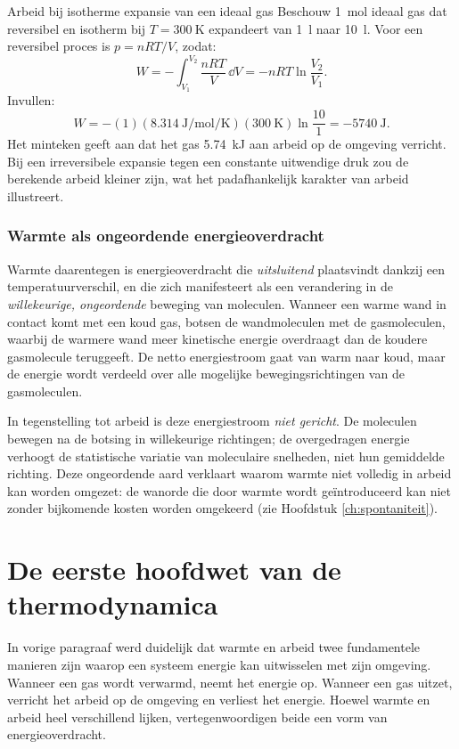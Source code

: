 \begin{voorbeeld}{Arbeid bij isotherme expansie van een ideaal gas}
Beschouw \SI{1}{\mole} ideaal gas dat reversibel en isotherm bij $T = \SI{300}{\kelvin}$ expandeert van \SI{1}{\litre} naar \SI{10}{\litre}. Voor een reversibel proces is $p = nRT/V$, zodat:
\[
W = -\int_{V_1}^{V_2} \frac{nRT}{V}\,\dd V = -nRT \ln\frac{V_2}{V_1}.
\]
Invullen:
\[
W = -(1)(\SI{8.314}{\joule\per\mole\per\kelvin})(\SI{300}{\kelvin})\ln\frac{10}{1} = -\SI{5740}{\joule}.
\]
Het minteken geeft aan dat het gas \SI{5.74}{\kilo\joule} aan arbeid op de omgeving verricht. Bij een irreversibele expansie tegen een constante uitwendige druk zou de berekende arbeid kleiner zijn, wat het padafhankelijk karakter van arbeid illustreert.
\end{voorbeeld}

\subsubsection{Warmte als ongeordende energieoverdracht}

Warmte daarentegen is energieoverdracht die \emph{uitsluitend} plaatsvindt dankzij een temperatuurverschil, en die zich manifesteert als een verandering in de \emph{willekeurige, ongeordende} beweging van moleculen. Wanneer een warme wand in contact komt met een koud gas, botsen de wandmoleculen met de gasmoleculen, waarbij de warmere wand meer kinetische energie overdraagt dan de koudere gasmolecule teruggeeft. De netto energiestroom gaat van warm naar koud, maar de energie wordt verdeeld over alle mogelijke bewegingsrichtingen van de gasmoleculen.

In tegenstelling tot arbeid is deze energiestroom \emph{niet gericht}. De moleculen bewegen na de botsing in willekeurige richtingen; de overgedragen energie verhoogt de statistische variatie van moleculaire snelheden, niet hun gemiddelde richting. Deze ongeordende aard verklaart waarom warmte niet volledig in arbeid kan worden omgezet: de wanorde die door warmte wordt ge\"introduceerd kan niet zonder bijkomende kosten worden omgekeerd (zie Hoofdstuk \ref{ch:spontaniteit}).


\section{De eerste hoofdwet van de thermodynamica}

In vorige paragraaf werd duidelijk dat warmte en arbeid twee fundamentele manieren zijn waarop een systeem energie kan uitwisselen met zijn omgeving. Wanneer een gas wordt verwarmd, neemt het energie op. Wanneer een gas uitzet, verricht het arbeid op de omgeving en verliest het energie. Hoewel warmte en arbeid heel verschillend lijken, vertegenwoordigen beide een vorm van energieoverdracht.

